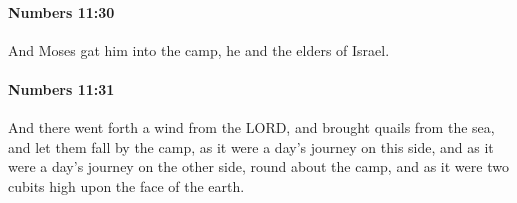 		\paragraph{Numbers 11:30} %
			\label{NUMBERS-11-30}

			And Moses gat him into the camp, he and the elders of Israel.


		\paragraph{Numbers 11:31} %
			\label{NUMBERS-11-31}

			And there went forth a wind from the LORD, and brought quails from the sea, and let them fall by the camp, as it were a day’s journey on this side, and as it were a day’s journey on the other side, round about the camp, and as it were two cubits high upon the face of the earth.


